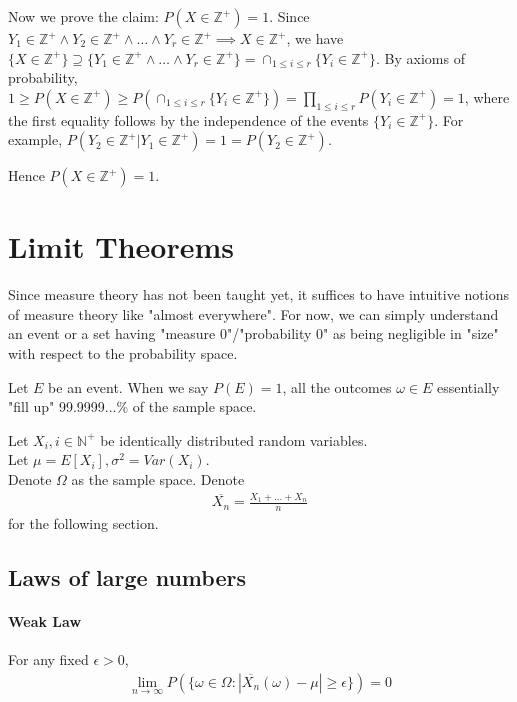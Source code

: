\documentclass{article}
\begin{document}
Now we prove the claim: $P(X\in \mathbb{Z}^+) = 1$. Since $Y_1 \in \mathbb{Z}^+\land Y_2\in \mathbb{Z}^+\land \dots \land Y_r\in \mathbb{Z}^+\implies X\in \mathbb{Z}^+$, we have $\{X\in \mathbb{Z}^+\}\supseteq \{Y_1 \in \mathbb{Z}^+\land \dots \land Y_r\in \mathbb{Z}^+\} = \cap_{1\leq i\leq r} \{Y_i\in \mathbb{Z}^+\}$. By axioms of probability, $1\geq P(X\in \mathbb{Z}^+)\geq P(\cap_{1\leq i\leq r} \{Y_i\in \mathbb{Z}^+\}) = \prod_{1\leq i\leq r}P(Y_i\in \mathbb{Z}^+)=1$, where the first equality follows by the independence of the events $\{Y_i\in \mathbb{Z}^+\}$. For example, $P(Y_2\in \mathbb{Z}^+ | Y_1\in \mathbb{Z}^+) = 1 = P(Y_2\in \mathbb{Z}^+)$.

Hence $P(X\in \mathbb{Z}^+) = 1$.




\section{Limit Theorems}
Since measure theory has not been taught yet, it suffices to have intuitive notions of measure theory like "almost everywhere". For now, we can simply understand an event or a set having "measure 0"/"probability 0" as being negligible in "size" with respect to the probability space.

Let $E$ be an event. When we say $P(E)=1$, all the outcomes $\omega \in E$ essentially "fill up" 99.9999...\% of the sample space.

Let $X_i, i\in \mathbb{N}^+$ be identically distributed random variables.\\
Let $\mu = E[X_i], \sigma^2 = Var(X_i)$.\\
Denote $\Omega$ as the sample space.
Denote 
\begin{align*}
\overline{X_n} = \frac{X_1+\dots + X_n}{n}
\end{align*}
for the following section.

\subsection{Laws of large numbers}
\paragraph{Weak Law}
For any fixed $\epsilon > 0$,
\begin{align*}
	\lim_{n\rightarrow \infty}P(\{\omega \in \Omega: |\overline{X_n}(\omega)-\mu|\geq \epsilon \}) = 0
\end{align*}
\end{document}
